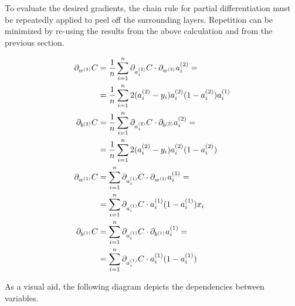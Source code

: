 \documentclass{article}
\begin{document}
To evaluate the desired gradients, the chain rule for partial differentiation must be repeatedly applied to peel off the surrounding layers. Repetition can be minimized by re-using the results from the above calculation and from the previous section.

\begin{align}
  \pd[w^{(2)}] C
          &= \avgsum[i, n] \pd[a_i^{(2)}] C \cdot \pd[w^{(2)}] a_i^{(2)} = \\
          &= \avgsum[i, n] 2(a_i^{(2)} - y_i)a_i^{(2)}(1 - a_i^{(2)})a_i^{(1)}\\
  \pd[b^{(2)}] C
          &= \avgsum[i, n] \pd[a_i^{(2)}] C \cdot \pd[b^{(2)}] a_i^{(2)} = \\
          &= \avgsum[i, n] 2(a_i^{(2)} - y_i)a_i^{(2)}(1 - a_i^{(2)})\\
  \pd[w^{(1)}] C
            &= \sum_{i=1}^n \pd[a_i^{(1)}] C \cdot \pd[w^{(1)}] a_i^{(1)} = \\
            &= \sum_{i=1}^n \pd[a_i^{(1)}] C \cdot a_i^{(1)}(1 - a_i^{(1)})x_i \\
  \pd[b^{(1)}] C
            &= \sum_{i=1}^n \pd[a_i^{(1)}] C \cdot \pd[b^{(1)}] a_i^{(1)} = \\
            &= \sum_{i=1}^n \pd[a_i^{(1)}] C \cdot a_i^{(1)}(1 - a_i^{(1)})
\end{align}

As a visual aid, the following diagram depicts the dependencies between variables.

\begin{center}
\end{center}
\end{document}
